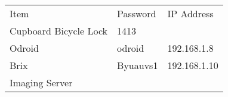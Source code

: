 \documentclass[]{auvsi_doc}
\begin{document}
\begin{longtable}[]{@{}lll@{}}
\toprule
\begin{minipage}[t]{0.30\columnwidth}\raggedright\strut
{Item}\strut
\end{minipage} & \begin{minipage}[t]{0.30\columnwidth}\raggedright\strut
{Password}\strut
\end{minipage} & \begin{minipage}[t]{0.30\columnwidth}\raggedright\strut
{IP Address}\strut
\end{minipage}\tabularnewline
\begin{minipage}[t]{0.30\columnwidth}\raggedright\strut
{Cupboard Bicycle Lock}\strut
\end{minipage} & \begin{minipage}[t]{0.30\columnwidth}\raggedright\strut
{1413}\strut
\end{minipage} & \begin{minipage}[t]{0.30\columnwidth}\raggedright\strut
{}\strut
\end{minipage}\tabularnewline
\begin{minipage}[t]{0.30\columnwidth}\raggedright\strut
{Odroid}\strut
\end{minipage} & \begin{minipage}[t]{0.30\columnwidth}\raggedright\strut
{odroid}\strut
\end{minipage} & \begin{minipage}[t]{0.30\columnwidth}\raggedright\strut
{192.168.1.8}\strut
\end{minipage}\tabularnewline
\begin{minipage}[t]{0.30\columnwidth}\raggedright\strut
{Brix}\strut
\end{minipage} & \begin{minipage}[t]{0.30\columnwidth}\raggedright\strut
{Byuauvs1}\strut
\end{minipage} & \begin{minipage}[t]{0.30\columnwidth}\raggedright\strut
{192.168.1.10}\strut
\end{minipage}\tabularnewline
\begin{minipage}[t]{0.30\columnwidth}\raggedright\strut
{Imaging Server}\strut
\end{minipage} & \begin{minipage}[t]{0.30\columnwidth}\raggedright\strut
{}\strut
\end{minipage} & \begin{minipage}[t]{0.30\columnwidth}\raggedright\strut

\end{minipage}
\end{longtable}
\end{document}
